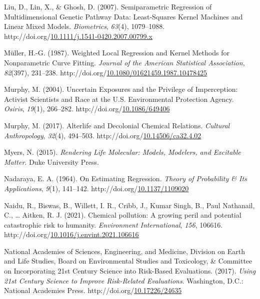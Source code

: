 \documentclass[12pt, twoside]{amherstthesis}
\newenvironment{CSLReferences}[2]%
  {}%
  {\par}
\begin{document}
\begin{CSLReferences}{1}{0}
\leavevmode{}%
Liu, D., Lin, X., \& Ghosh, D. (2007). Semiparametric {Regression} of {Multidimensional} {Genetic} {Pathway} {Data}: {Least}-{Squares} {Kernel} {Machines} and {Linear} {Mixed} {Models}. \emph{Biometrics}, \emph{63}(4), 1079--1088. http://doi.org/\href{https://doi.org/10.1111/j.1541-0420.2007.00799.x}{10.1111/j.1541-0420.2007.00799.x}

\leavevmode{}%
Müller, H.-G. (1987). Weighted {Local} {Regression} and {Kernel} {Methods} for {Nonparametric} {Curve} {Fitting}. \emph{Journal of the American Statistical Association}, \emph{82}(397), 231--238. http://doi.org/\href{https://doi.org/10.1080/01621459.1987.10478425}{10.1080/01621459.1987.10478425}

\leavevmode{}%
Murphy, M. (2004). Uncertain {Exposures} and the {Privilege} of {Imperception}: {Activist} {Scientists} and {Race} at the {U}.{S}. {Environmental} {Protection} {Agency}. \emph{Osiris}, \emph{19}(1), 266--282. http://doi.org/\href{https://doi.org/10.1086/649406}{10.1086/649406}

\leavevmode{}%
Murphy, M. (2017). Alterlife and {Decolonial} {Chemical} {Relations}. \emph{Cultural Anthropology}, \emph{32}(4), 494--503. http://doi.org/\href{https://doi.org/10.14506/ca32.4.02}{10.14506/ca32.4.02}

\leavevmode{}%
Myers, N. (2015). \emph{Rendering {Life} {Molecular}: {Models}, {Modelers}, and {Excitable} {Matter}}. Duke University Press.

\leavevmode{}%
Nadaraya, E. A. (1964). On {Estimating} {Regression}. \emph{Theory of Probability \& Its Applications}, \emph{9}(1), 141--142. http://doi.org/\href{https://doi.org/10.1137/1109020}{10.1137/1109020}

\leavevmode{}%
Naidu, R., Biswas, B., Willett, I. R., Cribb, J., Kumar Singh, B., Paul Nathanail, C., \ldots{} Aitken, R. J. (2021). Chemical pollution: {A} growing peril and potential catastrophic risk to humanity. \emph{Environment International}, \emph{156}, 106616. http://doi.org/\href{https://doi.org/10.1016/j.envint.2021.106616}{10.1016/j.envint.2021.106616}

\leavevmode{}%
National Academies of Sciences, Engineering, and Medicine, Division on Earth and Life Studies, Board on Environmental Studies and Toxicology, \& Committee on Incorporating 21st Century Science into Risk-Based Evaluations. (2017). \emph{Using 21st {Century} {Science} to {Improve} {Risk}-{Related} {Evaluations}}. Washington, D.C.: National Academies Press. http://doi.org/\href{https://doi.org/10.17226/24635}{10.17226/24635}


\end{CSLReferences}
\end{document}

